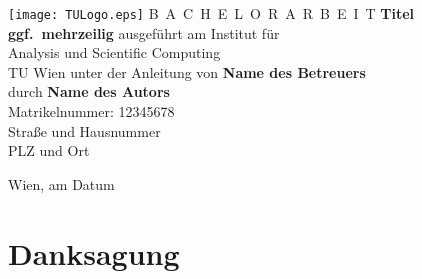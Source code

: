\documentclass[a4paper,11pt,bibliography=totoc,listof=totoc,headinclude=true,cleardoublepage=empty,oneside]{scrbook}
\begin{document}


\begin{titlepage}
  \begin{center}
    \texttt{[image: TULogo.eps]}
    \vskip 1cm%
    {\LARGE B~\Large A~C~H~E~L~O~R~A~R~B~E~I~T}
    \vskip 8mm
    {\huge\bfseries\color{change}Titel \\[1ex] ggf.\ mehrzeilig}
    \vskip 1cm
    \large 
    ausgef\"uhrt am    
    \vskip 0.75cm
    {\Large Institut f\"ur\\[1ex] Analysis und Scientific Computing}\\[1ex]
    {\Large TU Wien}
    \vskip0.75cm
    unter der Anleitung von
    \vskip0.75cm
    {\Large\bfseries\color{change}Name des Betreuers}\\[1ex]
    \vskip 0.5cm
    durch
    \vskip 0.5cm
    {\Large\bfseries\color{change}Name des Autors}\\[1ex]
    Matrikelnummer: {\color{change}12345678}\\[1ex]
    {\color{change}Straße und Hausnummer}\\[1ex]
    {\color{change}PLZ und Ort}
  \end{center}
  
  \vfill
  
  \small
  Wien, am {\color{change} Datum} %
  \vspace*{-15mm}
\end{titlepage}

\cleardoublepage


\chapter*{Danksagung} %
\thispagestyle{empty}
\end{document}

